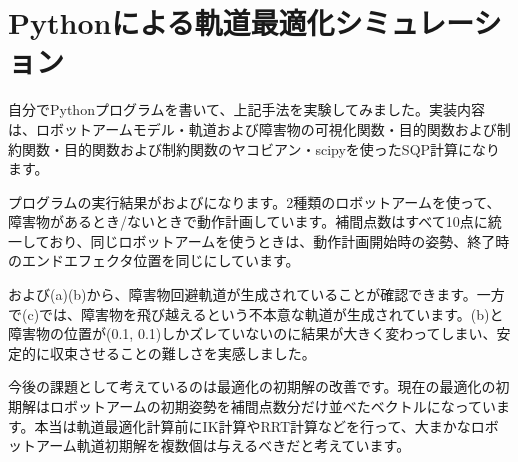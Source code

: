 \clearpage
\section{Pythonによる軌道最適化シミュレーション}
自分でPythonプログラムを書いて、上記手法を実験してみました。実装内容は、ロボットアームモデル・軌道および障害物の可視化関数・目的関数および制約関数・目的関数および制約関数のヤコビアン・scipyを使ったSQP計算になります。

プログラムの実行結果がおよびになります。2種類のロボットアームを使って、障害物があるとき/ないときで動作計画しています。補間点数はすべて10点に統一しており、同じロボットアームを使うときは、動作計画開始時の姿勢、終了時のエンドエフェクタ位置を同じにしています。

および(a)(b)から、障害物回避軌道が生成されていることが確認できます。一方で(c)では、障害物を飛び越えるという不本意な軌道が生成されています。(b)と障害物の位置が(0.1, 0.1)しかズレていないのに結果が大きく変わってしまい、安定的に収束させることの難しさを実感しました。

今後の課題として考えているのは最適化の初期解の改善です。現在の最適化の初期解はロボットアームの初期姿勢を補間点数分だけ並べたベクトルになっています。本当は軌道最適化計算前にIK計算やRRT計算などを行って、大まかなロボットアーム軌道初期解を複数個は与えるべきだと考えています。

